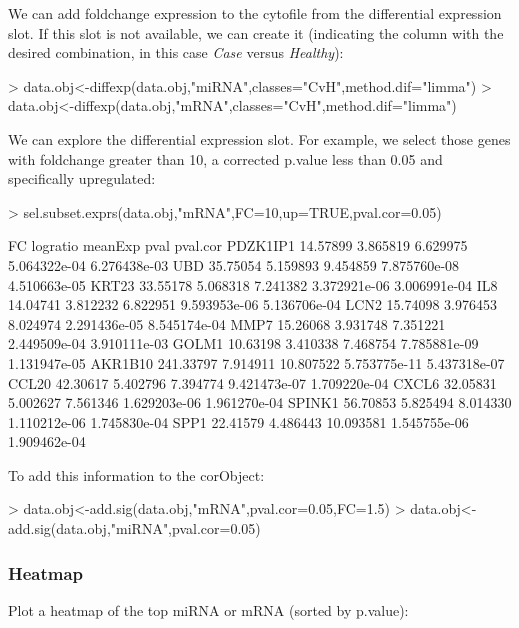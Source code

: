 \documentclass{article}
\begin{document}
We can add foldchange expression to the cytofile from the differential expression slot. If this slot is not available, we can create it (indicating the column with the desired combination, in this case \emph{Case} versus \emph{Healthy}):\\
\begin{Schunk}
\begin{Sinput}
> data.obj<-diffexp(data.obj,"miRNA",classes="CvH",method.dif="limma")
> data.obj<-diffexp(data.obj,"mRNA",classes="CvH",method.dif="limma")
\end{Sinput}
\end{Schunk}
We can explore the differential expression slot. For example, we select those genes with foldchange greater than 10, a corrected p.value less than 0.05 and specifically upregulated:
\begin{Schunk}
\begin{Sinput}
> sel.subset.exprs(data.obj,"mRNA",FC=10,up=TRUE,pval.cor=0.05)
\end{Sinput}
\begin{Soutput}
                FC logratio   meanExp         pval     pval.cor
PDZK1IP1  14.57899 3.865819  6.629975 5.064322e-04 6.276438e-03
UBD       35.75054 5.159893  9.454859 7.875760e-08 4.510663e-05
KRT23     33.55178 5.068318  7.241382 3.372921e-06 3.006991e-04
IL8       14.04741 3.812232  6.822951 9.593953e-06 5.136706e-04
LCN2      15.74098 3.976453  8.024974 2.291436e-05 8.545174e-04
MMP7      15.26068 3.931748  7.351221 2.449509e-04 3.910111e-03
GOLM1     10.63198 3.410338  7.468754 7.785881e-09 1.131947e-05
AKR1B10  241.33797 7.914911 10.807522 5.753775e-11 5.437318e-07
CCL20     42.30617 5.402796  7.394774 9.421473e-07 1.709220e-04
CXCL6     32.05831 5.002627  7.561346 1.629203e-06 1.961270e-04
SPINK1    56.70853 5.825494  8.014330 1.110212e-06 1.745830e-04
SPP1      22.41579 4.486443 10.093581 1.545755e-06 1.909462e-04
\end{Soutput}
\end{Schunk}

To add this information to the corObject:
\begin{Schunk}
\begin{Sinput}
> data.obj<-add.sig(data.obj,"mRNA",pval.cor=0.05,FC=1.5)
> data.obj<-add.sig(data.obj,"miRNA",pval.cor=0.05)
\end{Sinput}
\end{Schunk}

\subsubsection{Heatmap}
Plot a heatmap of the top miRNA or mRNA (sorted by p.value):
\end{document}

